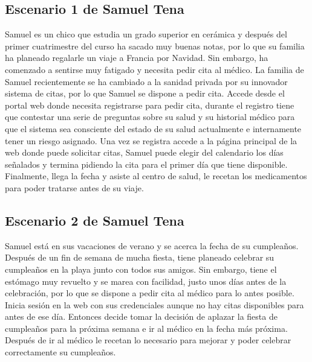 \subsection{Escenario 1 de Samuel Tena} 
    Samuel es un chico que estudia un grado superior en cerámica y después del primer
    cuatrimestre del curso ha sacado muy buenas notas, por lo que su familia ha planeado
    regalarle un viaje a Francia por Navidad. Sin embargo, ha comenzado a sentirse muy fatigado
     y necesita pedir cita al médico. La familia de Samuel recientemente
    se ha cambiado a la sanidad privada por su innovador sistema de citas, por lo que Samuel se
    dispone a pedir cita. Accede desde el portal web donde necesita registrarse para pedir cita,
    durante el registro tiene que contestar una serie de preguntas sobre su salud y su historial
    médico para que el sistema sea consciente del estado de su salud actualmente e internamente 
    tener un riesgo asignado. Una vez se registra accede a la página principal de la web donde puede
    solicitar citas, Samuel puede elegir del calendario los días señalados y termina pidiendo la cita
    para el primer día que tiene disponible. Finalmente, llega la fecha y asiste al centro de salud, le recetan los
    medicamentos para poder tratarse antes de su viaje.


\subsection{Escenario 2 de Samuel Tena}
    Samuel está en sus vacaciones de verano y se acerca la fecha de su cumpleaños. 
    Después de un fin de semana de mucha fiesta, tiene planeado celebrar su cumpleaños 
    en la playa junto con todos sus amigos. Sin embargo, tiene el estómago muy revuelto 
    y se marea con facilidad, justo unos días antes de la celebración, por lo que se dispone 
    a pedir cita al médico para lo antes posible. Inicia sesión en la web con sus credenciales 
    aunque no hay citas disponibles para antes de ese día. Entonces decide tomar la decisión 
    de aplazar la fiesta de cumpleaños para la próxima semana e ir al médico en la fecha más próxima.
    Después de ir al médico le recetan lo necesario para mejorar y poder celebrar correctamente 
    su cumpleaños. 
    


